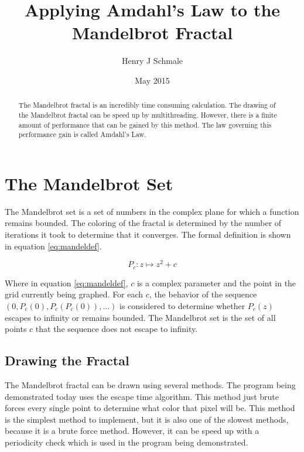 \documentclass[11pt,oneside,letterpaper]{article}
\begin{document}
\title{Applying Amdahl's Law to the Mandelbrot Fractal}
\author{Henry J Schmale}
\date{May 2015}
\maketitle

\begin{abstract}
The Mandelbrot fractal is an incredibly time consuming calculation.
The drawing of the Mandelbrot fractal can be speed up by multithreading.
However, there is a finite amount of performance that can be gained by
this method. The law governing this performance gain is called Amdahl's
Law.
\end{abstract}

\section{The Mandelbrot Set}
The Mandelbrot set is a set of numbers in the complex plane for which
a function remains bounded. The coloring of the fractal is determined
by the number of iterations it took to determine that it converges.
The formal definition is shown in equation \eqref{eq:mandeldef}.

\begin{equation}\label{eq:mandeldef}
    P_{c}: z \mapsto z^2 + c    
\end{equation}

Where in equation \eqref{eq:mandeldef}, $c$ is a complex parameter and the 
point in the grid currently being graphed. For each $c$, the behavior of the
sequence $(0, P_{c}(0), P_{c}(P_{c}(0)),...)$ is considered to determine
whether $P_{c}(z)$ escapes to infinity or remains bounded. The Mandelbrot
set is the set of all points $c$ that the sequence does not escape to
infinity.

\subsection{Drawing the Fractal}
The Mandelbrot fractal can be drawn using several methods. The
program being demonstrated today uses the escape time algorithm.
This method just brute forces every single point to determine what color
that pixel will be. This method is the simplest method to implement, but
it is also one of the slowest methods, because it is a brute force method.
However, it can be speed up with a periodicity check which is used in the
program being demonstrated.


\end{document}
